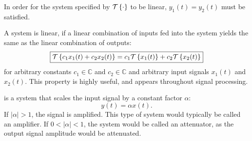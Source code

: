\begin{marginfigure}[-3cm]
\begin{center}
      \vspace{1em}
   \end{center}
   \label{fig:linearity_block}
   \caption{In order for the system specified by $\mathcal{T}\left\{\cdot\right\}$ to be linear, $y_1(t) = y_2(t)$ must be satisfied.}
\end{marginfigure}

A system is linear, if a linear combination of inputs fed into the system yields the same as the linear combination of outputs:
\begin{equation}
   \boxed{
      \spop[c_1 x_1(t) + c_2 x_2(t)] = c_1 \spop[x_1(t)] + c_2 \spop[ x_2(t) ]}
   \label{def:linear_sys}
\end{equation}
for arbitrary constants $c_1 \in \mathbb{C}$ and $c_2 \in \mathbb{C}$ and 
arbitrary input signals $x_1(t)$ and $x_2(t)$. This property is highly useful, 
and appears throughout signal processing.

 is a system that scales the input 
signal by a constant factor $\alpha$:
\begin{equation}
   y(t) = \alpha x(t).
\end{equation}
If $|\alpha| >1$, the signal is amplified. This type of system would typically 
be called an amplifier. If $0<|\alpha|<1$, the system would be called an attenuator, 
as the output signal amplitude would be attenuated.

